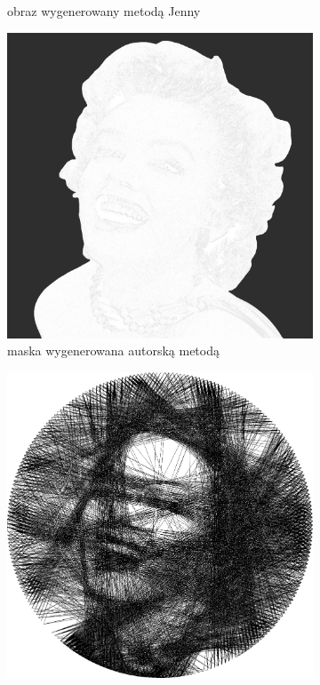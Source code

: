 \begin{figure}[H]
\begin{subfigure}{0.49\textwidth}
            \caption{obraz wygenerowany metodą Jenny}
            \label{comp-comp-monroe-b}
        \end{subfigure}
        \begin{subfigure}{0.49\textwidth}
            \centering
            \includegraphics[width = \textwidth]{img/6-comp/monroe-portrait_mask_c20_inv0_bg10_obj1_ed1.png}
            \caption{maska wygenerowana autorską metodą}
            \label{comp-comp-monroe-c}
        \end{subfigure}
        \begin{subfigure}{0.49\textwidth}
            \centering
            \includegraphics[width = \textwidth]{img/6-comp/monroe-portrait_e_i2000_c20_inv0_bg10_obj1_ed1.png}

\end{subfigure}
\end{figure}
